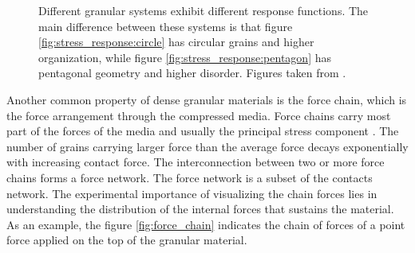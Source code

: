 \begin{figure}
\begin{minipage}{.45\linewidth}
        \label{fig:stress_response:pentagon}
    \end{minipage}
    \caption{Different granular systems exhibit different response functions. The main difference between these systems is that figure \ref{fig:stress_response:circle} has circular grains and higher organization, while figure \ref{fig:stress_response:pentagon} has pentagonal geometry and higher disorder. Figures taken from \cite{Sensitivity_of_Stress_Response_Function_to_Packing_Preparation}.}
    \label{fig:stress_response}
\end{figure}


    Another common property of dense granular materials is the force chain, which is the force arrangement through the compressed media. Force chains carry most part of the forces of the media and usually the principal stress component \cite{Characterization_of_force_chains_in_granular_material, Granular_and_Complex_Materials}. The number of grains carrying larger force than the average force decays exponentially with increasing contact force. The interconnection between two or more force chains forms a force network. The force network is a subset of the contacts network. The experimental importance of visualizing the chain forces lies in understanding the distribution of the internal forces that sustains the material. As an example, the figure \ref{fig:force_chain} indicates the chain of forces of a point force applied on the top of the granular material.

